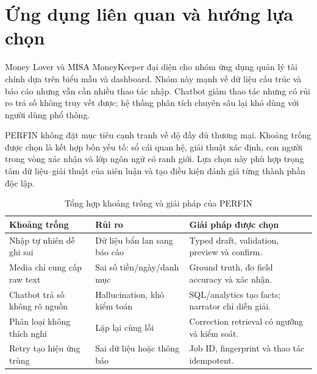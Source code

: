 \section{Ứng dụng liên quan và hướng lựa chọn}

Money Lover \cite{moneylover} và MISA MoneyKeeper \cite{misamoneykeeper} đại diện cho nhóm ứng dụng quản lý tài chính dựa trên biểu mẫu và dashboard. Nhóm này mạnh về dữ liệu cấu trúc và báo cáo nhưng vẫn cần nhiều thao tác nhập. Chatbot giảm thao tác nhưng có rủi ro trả số không truy vết được; hệ thống phân tích chuyên sâu lại khó dùng với người dùng phổ thông.

PERFIN không đặt mục tiêu cạnh tranh về độ đầy đủ thương mại. Khoảng trống được chọn là kết hợp bốn yếu tố: sổ cái quan hệ, giải thuật xác định, con người trong vòng xác nhận và lớp ngôn ngữ có ranh giới. Lựa chọn này phù hợp trọng tâm dữ liệu--giải thuật của niên luận và tạo điều kiện đánh giá từng thành phần độc lập.

\begin{table}[H]
  \centering
  \caption{Tổng hợp khoảng trống và giải pháp của PERFIN}
  \label{tab:research-gaps}
  \begin{tabularx}{\textwidth}{@{}Y Y Y@{}}
    \toprule
    \textbf{Khoảng trống} & \textbf{Rủi ro} & \textbf{Giải pháp được chọn} \\
    \midrule
    Nhập tự nhiên dễ ghi sai & Dữ liệu bẩn lan sang báo cáo & Typed draft, validation, preview và confirm. \\
    Media chỉ cung cấp raw text & Sai số tiền/ngày/danh mục & Ground truth, đo field accuracy và xác nhận. \\
    Chatbot trả số không rõ nguồn & Hallucination, khó kiểm toán & SQL/analytics tạo facts; narrator chỉ diễn giải. \\
    Phân loại không thích nghi & Lặp lại cùng lỗi & Correction retrieval có ngưỡng và kiểm soát. \\
    Retry tạo hiệu ứng trùng & Sai dữ liệu hoặc thông báo & Job ID, fingerprint và thao tác idempotent. \\
    \bottomrule
  \end{tabularx}
\end{table}
